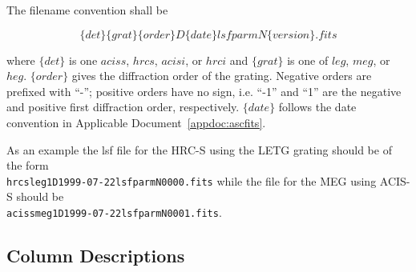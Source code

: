\documentclass[twoside]{article}
\begin{document}
The filename convention shall be

$$\{ det\} \{grat\}\{order\}D \{date\} lsfparmN\{version\}.fits$$

where $\{det\}$ is one  $aciss$, $hrcs$, $acisi$, or $hrci$ and $\{grat\}$ is one of $leg$, $meg$,
or $heg$. $\{order\}$ gives the diffraction order of the grating. Negative orders are prefixed with ``-''; positive orders have no sign, i.e. ``-1'' and ``1'' are the negative and positive first diffraction order, respectively.
$\{date\}$ follows the date convention in Applicable
Document~\ref{appdoc:ascfits}.

As an example the lsf file for the HRC-S using the LETG grating should
be of the form \\\mbox{\texttt{hrcsleg1D1999-07-22lsfparmN0000.fits}}
while the file for the MEG using ACIS-S should be
\\\mbox{\texttt{acissmeg1D1999-07-22lsfparmN0001.fits}}.

\subsection{Column Descriptions}
\end{document}
